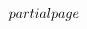 $${  \hoffset = \dimen0 \advance\hoffset by -1in 
  \advance\dimen2 by -\hoffset	%
  \advance\hsize by \dimen2	%
}%
\def\advanceleftmargin{%
  \dimen0 = 0pt \afterassignment\@finishadvanceleftmargin \advance\dimen0 
}%
\def\@finishadvanceleftmargin{%
  \advance\hoffset by \dimen0 
  \advance\hsize by -\dimen0 
}%
\def\rightmargin{\afterassignment\@finishrightmargin \dimen0}%
\def\@finishrightmargin{%
  \@computerightmargin		%
  \advance\dimen2 by -\dimen0	%
  \advance\hsize by \dimen2	%
}%
\def\advancerightmargin{%
  \dimen0 = 0pt \afterassignment\@finishadvancerightmargin \advance\dimen0 
}%
\def\@finishadvancerightmargin{%
  \advance\hsize by -\dimen0 
}%
\def\@computerightmargin{%
  \dimen2 = \paperwidth		%
  \advance\dimen2 by -\hsize	%
  \advance\dimen2 by -\hoffset	%
  \advance\dimen2 by -1in	%
}%
\newskip\abovedoublecolumnskip \abovedoublecolumnskip = \bigskipamount 
\newskip\belowdoublecolumnskip \belowdoublecolumnskip = \bigskipamount 
\newdimen\gutter \gutter = 2pc 
\newdimen\doublecolumnhsize 
\newbox\@partialpage \newdimen\singlecolumnhsize \newdimen\singlecolumnvsize 
\newtoks\previousoutput 
\def\doublecolumns{%
   \doublecolumnhsize = \hsize   %
   \par   %
   \previousoutput = \expandafter{\the\output}%
   \advance\doublecolumnhsize by -\gutter 
   \divide\doublecolumnhsize by 2 
   \output = {%
  \global\setbox\@partialpage = 
     \vbox{\unvbox255\vskip\abovedoublecolumnskip}%
   }%
   \pagegoal = \pagetotal 
   \break %
   \output = {\doublecolumnoutput}%
   \singlecolumnhsize = \hsize 
   \singlecolumnvsize = \vsize 
   \hsize = \doublecolumnhsize 
   \vsize = 2\vsize 
}%
\def\@doublecolumnsplit{%
   \splittopskip = \topskip 
   \splitmaxdepth = \maxdepth 
   \dimen0 = \singlecolumnvsize 
  \advance\dimen0 by -\ht\@partialpage 
  \advance\dimen0 by -\ht\footins 
  \ifvoid\footins\else \advance\dimen0 by -\skip\footins \fi 
  \advance\dimen0 by -\ht\topins 
  \ifvoid\topins\else \advance\dimen0 by -\skip\topins \fi 
   \begingroup 
  \vbadness = 10000 
  \global\setbox1 = \vsplit255 to \dimen0 
  \wd1 = \hsize 
  \global\setbox3 = \vsplit255 to \dimen0 
  \wd3 = \hsize	 
   \endgroup 
   \global\setbox4 = \vbox{\unvbox255 \penalty\outputpenalty}%
}$$
